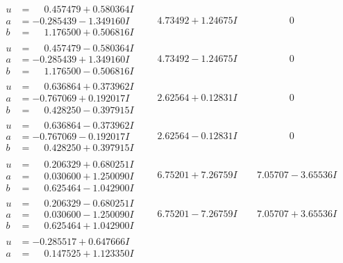 \documentclass[1p]{elsarticle_modified}
\theoremstyle{definition}
\begin{document}
$$\begin{array}{c|c|c}
\begin{aligned}
u &= \phantom{-}0.457479 + 0.580364 I \\
a &= -0.285439 - 1.349160 I \\
b &= \phantom{-}1.176500 + 0.506816 I\end{aligned}
 & \phantom{-}4.73492 + 1.24675 I & \phantom{-0.000000 } 0 \\ \hline\begin{aligned}
u &= \phantom{-}0.457479 - 0.580364 I \\
a &= -0.285439 + 1.349160 I \\
b &= \phantom{-}1.176500 - 0.506816 I\end{aligned}
 & \phantom{-}4.73492 - 1.24675 I & \phantom{-0.000000 } 0 \\ \hline\begin{aligned}
u &= \phantom{-}0.636864 + 0.373962 I \\
a &= -0.767069 + 0.192017 I \\
b &= \phantom{-}0.428250 - 0.397915 I\end{aligned}
 & \phantom{-}2.62564 + 0.12831 I & \phantom{-0.000000 } 0 \\ \hline\begin{aligned}
u &= \phantom{-}0.636864 - 0.373962 I \\
a &= -0.767069 - 0.192017 I \\
b &= \phantom{-}0.428250 + 0.397915 I\end{aligned}
 & \phantom{-}2.62564 - 0.12831 I & \phantom{-0.000000 } 0 \\ \hline\begin{aligned}
u &= \phantom{-}0.206329 + 0.680251 I \\
a &= \phantom{-}0.030600 + 1.250090 I \\
b &= \phantom{-}0.625464 - 1.042900 I\end{aligned}
 & \phantom{-}6.75201 + 7.26759 I & \phantom{-}7.05707 - 3.65536 I \\ \hline\begin{aligned}
u &= \phantom{-}0.206329 - 0.680251 I \\
a &= \phantom{-}0.030600 - 1.250090 I \\
b &= \phantom{-}0.625464 + 1.042900 I\end{aligned}
 & \phantom{-}6.75201 - 7.26759 I & \phantom{-}7.05707 + 3.65536 I \\ \hline\begin{aligned}
u &= -0.285517 + 0.647666 I \\
a &= \phantom{-}0.147525 + 1.123350 I \\

\end{aligned}
\end{array}$$
\end{document}
